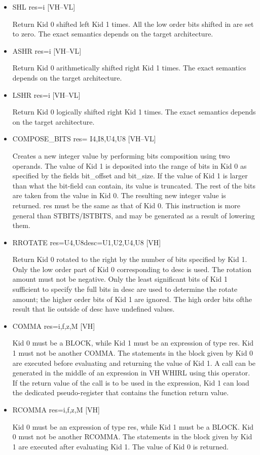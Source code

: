 \documentclass{article}
\begin{document}
\begin{itemize}
\item  SHL res=i \hfill [VH--VL]

Return Kid 0 shifted left Kid 1 times. All the low order bits
shifted in are set to zero. The exact semantics depends on the target
architecture.

\item  ASHR res=i \hfill [VH--VL]

Return Kid 0 arithmetically shifted right Kid 1 times. The exact
semantics depends on the target architecture.

\item  LSHR res=i \hfill [VH--VL]

Return Kid 0 logically shifted right Kid 1 times. The exact semantics
depends on the target architecture.

\item  COMPOSE\_BITS res= I4,I8,U4,U8 \hfill [VH--VL]

Creates a new integer value by performing bits composition using
two operands. The value of Kid 1 is deposited into the range of bits
in Kid 0
as specified by the fields bit\_offset and bit\_size. If the value
of Kid 1 is larger than what the bit-field can contain, its value
is truncated. The rest of the bits are taken from the value in Kid
0. The resulting new integer value is returned. res must be the same
as that of Kid 0. This instruction is more general than STBITS/ISTBITS,
and may be generated as a result of lowering them.

\item  RROTATE res=U4,U8desc=U1,U2,U4,U8 \hfill [VH]

Return Kid 0 rotated to the right by the number of bits specified
by Kid 1. Only the low order part of Kid 0 corresponding to desc is
used. The rotation amount must not be negative. Only the least
significant bits of Kid 1 sufficient to specify the full bits in
desc are used to determine the rotate amount; the higher order bits
of Kid 1 are ignored. The high order bits ofthe result that lie
outside of desc have undefined values.

\item  COMMA res=i,f,z,M \hfill [VH]

Kid 0 must be a BLOCK, while Kid 1 must be an expression of type
res. Kid 1 must not be another
COMMA. The statements in the block given by
Kid 0 are executed before evaluating and returning the value of
Kid 1. A call can be generated in the middle of an expression in VH
WHIRL using this operator. If the return value of the call is to
be used in the expression, Kid 1 can load the dedicated pseudo-register
that contains the function return value. 

\item  RCOMMA res=i,f,z,M \hfill [VH]

Kid 0 must be an expression of type res, while Kid 1 must be a
BLOCK. Kid 0 must not be another
RCOMMA. The statements in the block given by Kid 1 are executed
after evaluating Kid 1. The value of Kid 0 is returned.
\end{itemize}
\end{document}
